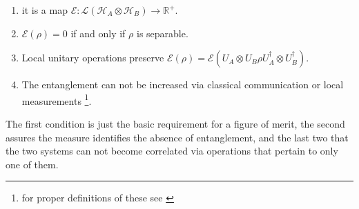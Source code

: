 \begin{enumerate}
        \item it is a map $\mathcal{E}:\mathcal{L}(\mathcal{H}_{A}\otimes\mathcal{H}_{B}) \to \mathds{R}^{+}$.
        \item $\mathcal{E}(\rho)=0$ if and only if $\rho$ is separable.
        \item Local unitary operations preserve $\mathcal{E}(\rho)=\mathcal{E}(U_{A}\otimes U_{B} \rho U_{A}^{\dagger}\otimes U_{B}^{\dagger} )$.
  \item The entanglement can not be increased via classical communication or local measurements \footnote{for proper definitions of
        these see \cite{diosi_short_2011, vedral1997quantifying}}.
\end{enumerate}
The first condition is just the basic requirement for a figure of merit, the second assures the measure identifies the absence of entanglement,
and the last two that the two systems can not become correlated via operations that pertain to only one of them.
